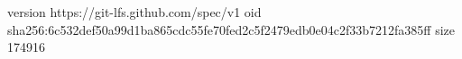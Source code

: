 version https://git-lfs.github.com/spec/v1
oid sha256:6c532def50a99d1ba865cdc55fe70fed2c5f2479edb0e04c2f33b7212fa385ff
size 174916
